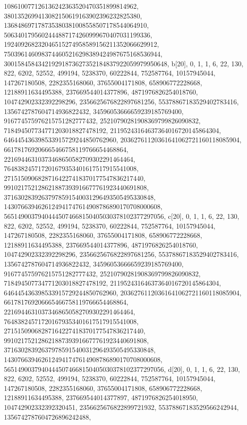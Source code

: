 {{{   108610077126136242363520470351899814962, 
   3801352699413082150619163902396232825380, 
   136848697178735380381008558507178544064910, 
   5063401795602444887174260999670407031199336, 
   192409268232046515274958589156211352066629912, 
   7503961460983744605216298389424987675168536944, 
   300158458434219291873627352184837922059979950648}}, 
 {b[20], {0, 1, 1, 6, 22, 130, 822, 6202, 52552, 499194, 5238370, 60222844, 
   752587764, 10157945044, 147267180508, 2282355168060, 37655004171808, 
   658906772228668, 12188911634495388, 237669544014377896, 
   4871976826254018760, 104742902332392298296, 2356625676822897681256, 
   55378867183529402783416, 1356742787604714936822432, 
   34596053666659239185769400, 916774575976215751282777432, 
   25210790281908369799826090832, 718494507734771203018827478192, 
   21195243164637364016720145864304, 646445436398533915729244850762960, 
   20362761120361641062721160118085904, 661781769206665466758119766654468864, 
   22169446310373468650582709302291464464, 
   764838245717201679353401617517915541008, 
   27151509068287164227418370177547836217440, 
   991021752128621887393916677761923440691808, 
   37163028392637978591540031296493505495330848, 
   1430766394626124941747614908786890170708000608, 
   56514900379404445074668150405030378102377297056}}, 
 {c[20], {0, 1, 1, 6, 22, 130, 822, 6202, 52552, 499194, 5238370, 60222844, 
   752587764, 10157945044, 147267180508, 2282355168060, 37655004171808, 
   658906772228668, 12188911634495388, 237669544014377896, 
   4871976826254018760, 104742902332392298296, 2356625676822897681256, 
   55378867183529402783416, 1356742787604714936822432, 
   34596053666659239185769400, 916774575976215751282777432, 
   25210790281908369799826090832, 718494507734771203018827478192, 
   21195243164637364016720145864304, 646445436398533915729244850762960, 
   20362761120361641062721160118085904, 661781769206665466758119766654468864, 
   22169446310373468650582709302291464464, 
   764838245717201679353401617517915541008, 
   27151509068287164227418370177547836217440, 
   991021752128621887393916677761923440691808, 
   37163028392637978591540031296493505495330848, 
   1430766394626124941747614908786890170708000608, 
   56514900379404445074668150405030378102377297056}}, 
 {d[20], {0, 1, 1, 6, 22, 130, 822, 6202, 52552, 499194, 5238370, 60222844, 
   752587764, 10157945044, 147267180508, 2282355168060, 37655004171808, 
   658906772228668, 12188911634495388, 237669544014377897, 
   4871976826254018950, 104742902332392320451, 2356625676822899721932, 
   55378867183529566242944, 1356742787604726896242488, 
}}}
